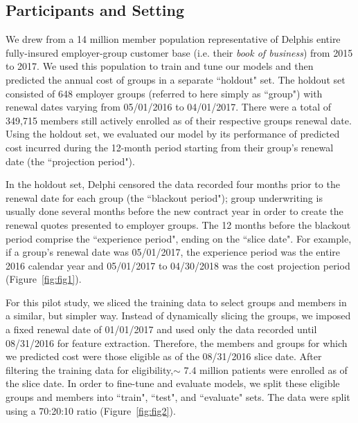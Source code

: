 \documentclass[letterpaper]{article} %
\begin{document}
\subsection{Participants and Setting}
We drew from a 14 million member population representative of Delphis entire fully-insured employer-group customer base (i.e. their \textit{book of business}) from 2015 to 2017. We used this population to train and tune our models and then predicted the annual cost of groups in a separate ``holdout" set. The holdout set consisted of 648 employer groups (referred  to here simply as ``group") with renewal dates varying from 05/01/2016 to 04/01/2017. There were a total of 349,715 members still actively enrolled as of their respective groups renewal date. Using the holdout set, we evaluated our model by its performance of predicted cost incurred during the 12-month period starting from their group's renewal date (the ``projection period").


In the holdout set, Delphi censored the data recorded four months prior to the renewal date for each group (the ``blackout period"); group underwriting is usually done several months before the new contract year in order to create the renewal quotes presented to employer groups. The 12 months before the blackout period comprise the ``experience period", ending on the ``slice date". For example, if a group's renewal date was 05/01/2017, the experience period was the entire 2016 calendar year and 05/01/2017 to 04/30/2018 was the cost projection period (Figure~\ref{fig:fig1}).


For this pilot study, we sliced the training data to select groups and members in a similar, but simpler way. Instead of dynamically slicing the groups, we imposed a fixed renewal date of 01/01/2017 and used only the data recorded until 08/31/2016 for feature extraction.  Therefore, the members and groups for which we predicted cost were those eligible as of the 08/31/2016 slice date. After filtering the training data for eligibility,$\sim$ 7.4 million patients were enrolled as of the slice date. In order to fine-tune and evaluate models, we split these eligible groups and members into ``train", ``test", and ``evaluate" sets. The data were split using a 70:20:10 ratio (Figure~\ref{fig:fig2}).
\end{document}
